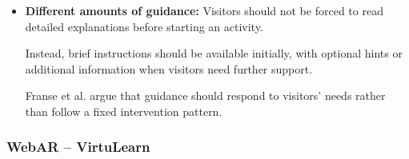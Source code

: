 \begin{itemize}
    In the evaluated museum, hands-on exhibits attracted
    visitors across different age and interest groups.
    \cite[p.~139]{hornecker_learning_2006}

    \item \textbf{Different amounts of guidance:}
    Visitors should not be forced to read detailed
    explanations before starting an activity.

    Instead, brief instructions should be available
    initially, with optional hints or additional information
    when visitors need further support.

    Franse et al. argue that guidance should respond
    to visitors' needs rather than follow a fixed
    intervention pattern.
    \cite[pp.~733--734]{franse_families_2021}

\end{itemize}


\subsubsection{WebAR -- VirtuLearn}

